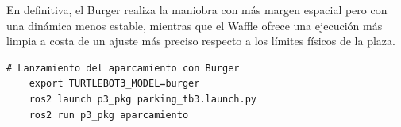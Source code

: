 En definitiva, el Burger realiza la maniobra con más margen espacial pero con una dinámica menos estable, mientras que el Waffle ofrece una ejecución más limpia a costa de un ajuste más preciso respecto a los límites físicos de la plaza.

\begin{lstlisting}[style=bash]
	# Lanzamiento del aparcamiento con Burger
	export TURTLEBOT3_MODEL=burger
	ros2 launch p3_pkg parking_tb3.launch.py
	ros2 run p3_pkg aparcamiento
\end{lstlisting}